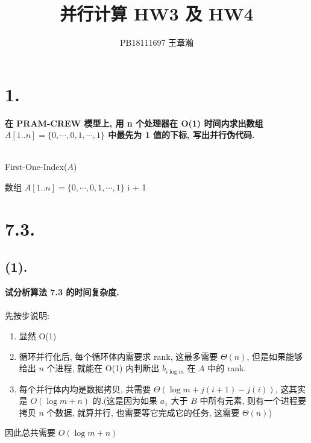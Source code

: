 \documentclass[UTF8]{article}
\title{并行计算 HW3 及 HW4}
\author{PB18111697 王章瀚}
\newcommand{\jumpLine} {\hspace*{\fill} \\}
\begin{document}
\maketitle
\section*{1.}
\noindent \textbf{在 PRAM-CREW 模型上, 用 n 个处理器在 O(1) 时间内求出数组 $A[1..n]=\{0,\cdots,0,1,\cdots,1\}$ 中最先为 1 值的下标, 写出并行伪代码.} \\ \jumpLine

\begin{algorithm}[H]
	\caption{{\sc First-One-Index}($A$)}
	\begin{algorithmic}[1] %
		\Require 数组 $A[1..n]=\{0,\cdots,0,1,\cdots,1\}$
					\State \Return i + 1
				\EndIf
			\EndFor
		\EndFunction
	\end{algorithmic}
\end{algorithm}

\section*{7.3.}
\subsection*{(1).}
\noindent \textbf{试分析算法 7.3 的时间复杂度.} \\ \jumpLine\noindent
先按步说明:
\begin{enumerate}[(1).]
	\item 显然 O(1)
	\item 循环并行化后, 每个循环体内需要求 rank, 这最多需要 $\Theta(n)$, 但是如果能够给出 $n$ 个进程, 就能在 O(1) 内判断出 $b_{i\log m}$ 在 $A$ 中的 rank.
	\item 每个并行体内均是数据拷贝, 共需要 $\Theta(\log m + j(i + 1) - j(i))$, 这其实是 $O(\log m + n)$ 的.(这是因为如果 $a_1$ 大于 $B$ 中所有元素, 则有一个进程要拷贝 $n$ 个数据, 就算并行, 也需要等它完成它的任务, 这需要 $\Theta(n)$)
\end{enumerate}
因此总共需要 $O(\log m + n)$
\end{document}
